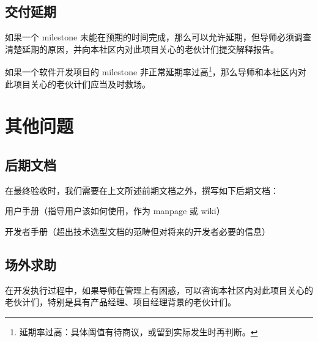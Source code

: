 \documentclass[a4paper,11pt]{article}
\newcommand{\smallnote}[1]{{\sffamily\footnotesize#1}}
\begin{document}
\subsection{交付延期}

如果一个 milestone 未能在预期的时间完成，那么可以允许延期，但导师必须调查清楚延期的原因，并向本社区内对此项目关心的老伙计们提交解释报告。

如果一个软件开发项目的 milestone 非正常延期率过高\footnote{延期率过高：具体阈值有待商议，或留到实际发生时再判断。}，那么导师和本社区内对此项目关心的老伙计们应当及时救场。















\section{其他问题}

\subsection{后期文档}

在最终验收时，我们需要在上文所述前期文档之外，撰写如下后期文档：

\begin{compactitem}
	\item 用户手册\smallnote{（指导用户该如何使用，作为 manpage 或 wiki）}
	\item 开发者手册\smallnote{（超出技术选型文档的范畴但对将来的开发者必要的信息）}
\end{compactitem}

\subsection{场外求助}

在开发执行过程中，如果导师在管理上有困惑，可以咨询本社区内对此项目关心的老伙计们，特别是具有产品经理、项目经理背景的老伙计们。
\end{document}
